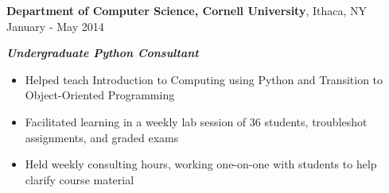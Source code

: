 
\vspace{5pt}

\textbf{Department of Computer Science, Cornell University}, Ithaca, NY \hfill January - May 2014

\textbf{\textit{Undergraduate Python Consultant}}

\begin{itemize}
    \item Helped teach Introduction to Computing using Python and Transition to Object-Oriented Programming
    \item Facilitated learning in a weekly lab session of 36 students, troubleshot assignments, and graded exams
    \item Held weekly consulting hours, working one-on-one with students to help clarify course material
\end{itemize}
